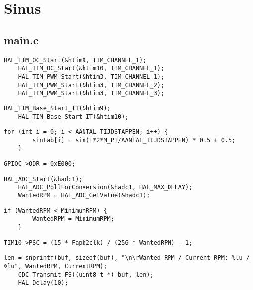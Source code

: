 \section{Sinus}

\subsection{main.c}
\begin{lstlisting}[caption={Activate necessary timers},label={lst:Registers}]
  	HAL_TIM_OC_Start(&htim9, TIM_CHANNEL_1);
  	HAL_TIM_OC_Start(&htim10, TIM_CHANNEL_1);
  	HAL_TIM_PWM_Start(&htim3, TIM_CHANNEL_1);
  	HAL_TIM_PWM_Start(&htim3, TIM_CHANNEL_2);
  	HAL_TIM_PWM_Start(&htim3, TIM_CHANNEL_3);
\end{lstlisting}

\begin{lstlisting}[caption={Start Interrupts},label={lst:Registers}]
  	HAL_TIM_Base_Start_IT(&htim9);
  	HAL_TIM_Base_Start_IT(&htim10);
\end{lstlisting}

\begin{lstlisting}[caption={Fill sintab array},label={lst:Registers}]
	for (int i = 0; i < AANTAL_TIJDSTAPPEN; i++) {
		sintab[i] = sin(i*2*M_PI/AANTAL_TIJDSTAPPEN) * 0.5 + 0.5;
	}
\end{lstlisting}

\begin{lstlisting}[caption={Enable Gate Drivers},label={lst:Registers}]
	GPIOC->ODR = 0xE000;
\end{lstlisting}

\begin{lstlisting}[caption={Read Potentiometer data from ADC for RPM control},label={lst:Registers}]
	HAL_ADC_Start(&hadc1);
	HAL_ADC_PollForConversion(&hadc1, HAL_MAX_DELAY);
	WantedRPM = HAL_ADC_GetValue(&hadc1);
\end{lstlisting}

\begin{lstlisting}[caption={Keep RPM to the minimum set in main.h},label={lst:Registers}]
	if (WantedRPM < MinimumRPM) {
		WantedRPM = MinimumRPM;
	}
\end{lstlisting}

\begin{lstlisting}[caption={Set PSC to appropriate value for RPM},label={lst:Registers}]
	TIM10->PSC = (15 * Fapb2clk) / (256 * WantedRPM) - 1;
\end{lstlisting}

\begin{lstlisting}[caption={Send RPM data to PC},label={lst:Registers}]
	len = snprintf(buf, sizeof(buf), "\n\rWanted RPM / Current RPM: %lu / %lu", WantedRPM, CurrentRPM);
	CDC_Transmit_FS((uint8_t *) buf, len);
	HAL_Delay(10);
\end{lstlisting}

